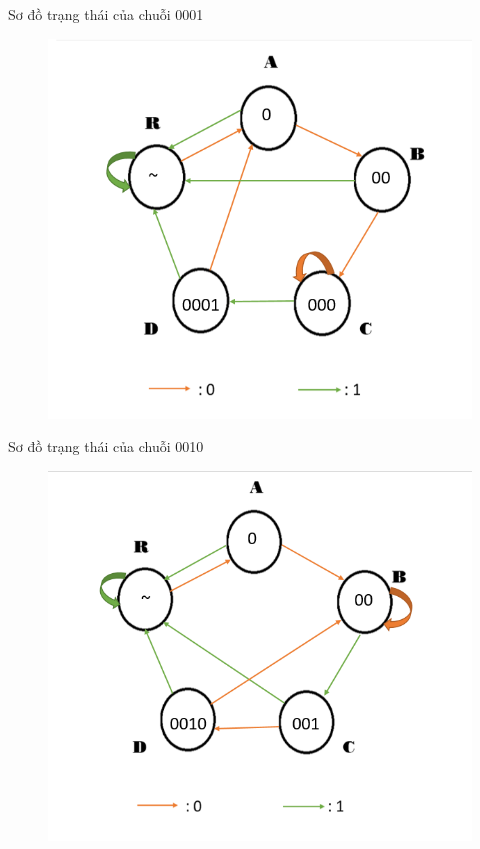 \documentclass[a4paper]{article}
\begin{document}
	Sơ đồ trạng thái của chuỗi 0001
	\begin{center}
	\begin{figure}[h]
		\begin{center}
			\includegraphics[scale=0.53]{0001.png}
		\end{center}
	\end{figure}
	\end{center}
	\newpage
	Sơ đồ trạng thái của chuỗi 0010
	\begin{center}
	\begin{figure}[h]
		\begin{center}
			\includegraphics[scale=0.53]{0010.png}
		\end{center}
	\end{figure}
	\end{center}
\end{document}
